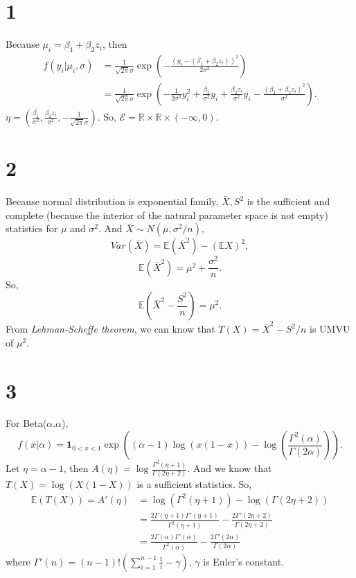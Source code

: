 \documentclass[en]{elegantpaper}
\begin{document}
\section*{1}
\noindent Because $\mu_i=\beta_1+\beta_2z_i$, then
\begin{align*}
    f(y_i|\mu_i,\sigma)&=\frac{1}{\sqrt{2\pi}\sigma}\exp\left(-\frac{(y_i-(\beta_1+\beta_2z_i))^2}{2\sigma^2}\right)\\
    &=\frac{1}{\sqrt{2\pi}\sigma}\exp\left(-\frac{1}{2\sigma^2}y_i^2+\frac{\beta_1}{\sigma^2}y_i+\frac{\beta_2z_i}{\sigma^2}y_i-\frac{(\beta_1+\beta_2z_i)^2}{\sigma^2}\right). 
\end{align*}
$\eta=(\frac{\beta_1}{\sigma^2}, \frac{\beta_2z_i}{\sigma^2}, -\frac{1}{\sqrt{2\pi}\sigma})$. So, $\mathcal{E}=\mathbb{R}\times\mathbb{R}\times(-\infty,0)$. 
\section*{2}
    \noindent Because normal distribution is exponential family, $\bar{X}, S^2$ is the sufficient and complete (because the interior of the natural parameter space is not empty) statistics for $\mu$ and $\sigma^2$. And $\bar{X}\sim N(\mu, \sigma^2/n)$, 
    \[
        Var(\bar{X})=\mathbb{E}(\bar{X}^2)-(\mathbb{E}X)^2, 
    \]
    \[
        \mathbb{E}(\bar{X}^2)=\mu^2+\frac{\sigma^2}{n}. 
    \]
    So, \[
        \mathbb{E}\left(\bar{X}^2-\frac{S^2}{n}\right)=\mu^2. 
    \]
    From \emph{Lehman-Scheffe theorem}, we can know that $T(X)=\bar{X}^2-S^2/n$ is UMVU of $\mu^2$. 
    \section*{3}
    \noindent For Beta($\alpha. \alpha$), 
    \[
        f(x|\alpha)=\mathbf{1}_{0<x<1}\exp\left((\alpha-1)\log(x(1-x))-\log\left(\frac{\Gamma^2(\alpha)}{\Gamma(2\alpha)}\right)\right). 
    \]
    Let $\eta=\alpha-1$, then $A(\eta)=\log\frac{\Gamma^2(\eta+1)}{\Gamma(2\eta+2)}$. And we know that $T(X)=\log(X(1-X))$ is a sufficient statistics. So, 
    \[
        \begin{aligned}
            \mathbb{E}(T(X))=A'(\eta){}&=\log(\Gamma^2(\eta+1))-\log(\Gamma(2\eta+2))\\&=\frac{2\Gamma(\eta+1)\Gamma'(\eta+1)}{\Gamma^2(\eta+1)}-\frac{2\Gamma'(2\eta+2)}{\Gamma(2\eta+2)}\\
            &=\frac{2\Gamma(\alpha)\Gamma'(\alpha)}{\Gamma^2(\alpha)}-\frac{2\Gamma'(2\alpha)}{\Gamma(2\alpha)}
        \end{aligned}
    \]
    where $\Gamma'(n)=(n-1)!\left(\sum_{i=1}^{n-1}\frac{1}{i}-\gamma\right)$, $\gamma$ is Euler's constant. 
\end{document}

